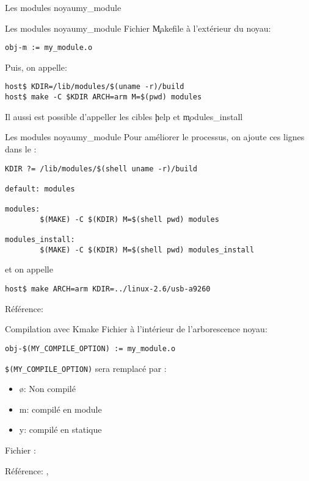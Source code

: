 \begin{frame}[fragile=singleslide]{Les modules noyau}{my\_module}
  
\end{frame}


\begin{frame}[fragile=singleslide]{Les modules noyau}{my\_module}
  Fichier \c{Makefile} à l'extérieur du noyau:
  \begin{lstlisting}
obj-m := my_module.o  
  \end{lstlisting}
  Puis, on appelle:
  \begin{lstlisting}
host$ KDIR=/lib/modules/$(uname -r)/build
host$ make -C $KDIR ARCH=arm M=$(pwd) modules
  \end{lstlisting} %
  Il aussi est possible d'appeller les cibles \c{help} et \c{modules_install}
\end{frame}

\begin{frame}[fragile=singleslide]{Les modules noyau}{my\_module}
  Pour améliorer le processus, on ajoute ces lignes dans le :
  \begin{lstlisting}
KDIR ?= /lib/modules/$(shell uname -r)/build

default: modules

modules:
        $(MAKE) -C $(KDIR) M=$(shell pwd) modules

modules_install:
        $(MAKE) -C $(KDIR) M=$(shell pwd) modules_install
  \end{lstlisting}
  et on appelle
  \begin{lstlisting}
host$ make ARCH=arm KDIR=../linux-2.6/usb-a9260 
  \end{lstlisting} %
  Référence: 
\end{frame}

\begin{frame}[fragile=singleslide]{Compilation avec Kmake}
  Fichier  à l'intérieur de l'arborescence noyau:
  \begin{lstlisting}
obj-$(MY_COMPILE_OPTION) := my_module.o  
  \end{lstlisting} %
  \lstinline+$(MY_COMPILE_OPTION)+ sera remplacé par :
  \begin{itemize}
  \item ø: Non compilé
  \item m: compilé en module
  \item y: compilé en statique
  \end{itemize}
  Fichier :
  
  Référence: , 
\end{frame}

